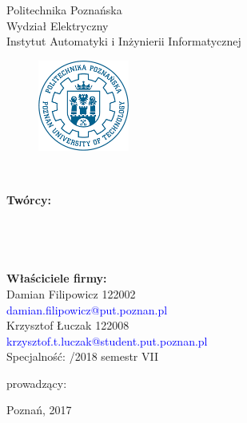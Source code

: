 \thispagestyle{empty}
\begin{center}
Politechnika Poznańska\\
Wydział Elektryczny\\  
Instytut Automatyki i Inżynierii Informatycznej\\
\begin{figure}[ht!]
\centering
\includegraphics[width=30mm]{pplogo.png}
\end{figure}
  \LARGE{\TytulPolski}\\ 
   \vspace{5mm}
\end{center}
   \begin{flushright}
   \normalsize\textbf {Twórcy:}\\
\large{\StudentA} \large{\AlbumA}\\
\textcolor{blue}{\large{\EmailA}}\\
\large{\StudentB} \large{\AlbumB}\\
\textcolor{blue}{\large{\EmailB}}\\

\vspace{5mm}
\normalsize\textbf {Właściciele firmy:}\\
\large{Damian Filipowicz} \large{122002}\\
\textcolor{blue}{\large{damian.filipowicz@put.poznan.pl}}\\
\large{Krzysztof Łuczak} \large{122008}\\
\textcolor{blue}{\large{krzysztof.t.luczak@student.put.poznan.pl}}\\
\vspace{3mm}
\large{Specjalność: /2018 semestr VII}



prowadzący:\\
\Prowadzacy
\end{flushright}

\begin{center}
Poznań, 2017
\end{center}